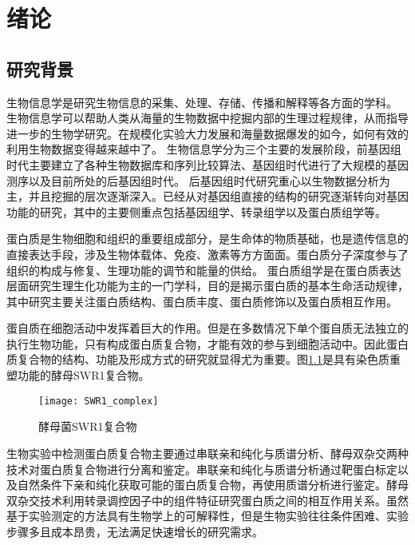 \chapter{绪论}
\label{chapter:intro}

\section{研究背景}
\label{section:background}

生物信息学是研究生物信息的采集、处理、存储、传播和解释等各方面的学科。
生物信息学可以帮助人类从海量的生物数据中挖掘内部的生理过程规律，从而指导进一步的生物学研究。在规模化实验大力发展和海量数据爆发的如今，如何有效的利用生物数据变得越来越中了。
生物信息学分为三个主要的发展阶段，前基因组时代主要建立了各种生物数据库和序列比较算法、基因组时代进行了大规模的基因测序以及目前所处的后基因组时代。
后基因组时代研究重心以生物数据分析为主，并且挖掘的层次逐渐深入。已经从对基因组直接的结构的研究逐渐转向对基因功能的研究，其中的主要侧重点包括基因组学、转录组学以及蛋白质组学等\cite{helms_principles_2019}。

蛋白质是生物细胞和组织的重要组成部分，是生命体的物质基础，也是遗传信息的直接表达手段，涉及生物体载体、免疫、激素等方方面面。蛋白质分子深度参与了组织的构成与修复、生理功能的调节和能量的供给。
蛋白质组学\cite{schubert_quantitative_2017}是在蛋白质表达层面研究生理生化功能为主的一门学科，目的是揭示蛋白质的基本生命活动规律，其中研究主要关注蛋白质结构、蛋白质丰度、蛋白质修饰以及蛋白质相互作用。

蛋自质在细胞活动中发挥着巨大的作用。但是在多数情况下单个蛋自质无法独立的执行生物功能，只有构成蛋白质复合物，才能有效的参与到细胞活动中\cite{gavin_functional_2002}。因此蛋白质复合物的结构、功能及形成方式的研究就显得尤为重要。图\ref{fig:swr1_complex}是具有染色质重塑功能的酵母SWR1复合物。
\begin{figure}[htbp]
  \centering
  \texttt{[image: SWR1\_complex]}
  \caption{酵母菌SWR1复合物}
  \label{fig:swr1_complex}
\end{figure}
生物实验中检测蛋白质复合物主要通过串联亲和纯化与质谱分析\cite{g_generic_1999}、酵母双杂交\cite{li_identification_1993}两种技术对蛋白质复合物进行分离和鉴定。串联亲和纯化与质谱分析通过靶蛋白标定以及自然条件下亲和纯化获取可能的蛋白质复合物，再使用质谱分析进行鉴定。酵母双杂交技术利用转录调控因子中的组件特征研究蛋白质之间的相互作用关系。虽然基于实验测定的方法具有生物学上的可解释性，但是生物实验往往条件困难、实验步骤多且成本昂贵，无法满足快速增长的研究需求。

